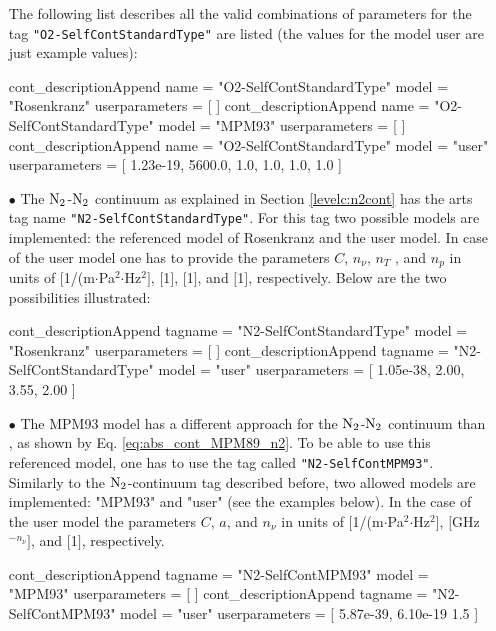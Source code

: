 \begin{itemize}
  The following list describes all the valid combinations of
  parameters for the tag {\tt "O2-SelfContStandardType"} are listed
  (the values for the model user are just example values):
\begin{code}
cont_descriptionAppend{
    name           = "O2-SelfContStandardType"
    model          = "Rosenkranz"
    userparameters = [ ]
}
cont_descriptionAppend{
    name           = "O2-SelfContStandardType"
    model          = "MPM93"
    userparameters = [ ]
}
cont_descriptionAppend{
    name           = "O2-SelfContStandardType"
    model          = "user"
    userparameters = [ 1.23e-19, 5600.0, 
                       1.0, 1.0, 1.0, 1.0 ]
}
\end{code}


\item[$\bullet$] The \citet{pwr:93} $\mbox{N}_2$-$\mbox{N}_2$ continuum as explained in Section 
\ref{levelc:n2cont} has the arts tag name {\tt "N2-SelfContStandardType"}. For this tag 
two possible models are implemented: the referenced model of Rosenkranz and the 
user model. In case of the user model one has to provide the parameters $C$, 
$n_{\nu}$, $n_T$ , and $n_p$ in units of
$[$1/(m$\cdot$Pa$^2$$\cdot$Hz$^2$$]$, $[$1$]$, $[$1$]$, and $[$1$]$,
respectively. Below are the two possibilities illustrated:
\begin{code}
cont_descriptionAppend{
    tagname        = "N2-SelfContStandardType"
    model          = "Rosenkranz"
    userparameters = [ ]
}
cont_descriptionAppend{
    tagname        = "N2-SelfContStandardType"
    model          = "user"
    userparameters = [ 1.05e-38, 2.00, 3.55, 2.00 ]
}
\end{code}

\item[$\bullet$] The MPM93 model \citep{liebeetal:93} has a different approach 
for the $\mbox{N}_2$-$\mbox{N}_2$ continuum than \citet{pwr:93}, as shown by 
Eq. \ref{eq:abs_cont_MPM89_n2}. To be able to use this referenced model, one 
has to use the tag called {\tt "N2-SelfContMPM93"}. Similarly to the 
$\mbox{N}_2$-continuum tag described before, two allowed models are implemented: 
"MPM93" and "user" (see the examples below).  In the case of the user model the 
parameters $C$, $a$, and $n_{\nu}$ in units of 
$[$1/(m$\cdot$Pa$^2$$\cdot$Hz$^2$$]$, $[$GHz$^{-n_{\nu}}$$]$, and $[$1$]$, 
respectively.
\begin{code}
cont_descriptionAppend{
    tagname        = "N2-SelfContMPM93"
    model          = "MPM93"
    userparameters = [ ]
}
cont_descriptionAppend{
    tagname        = "N2-SelfContMPM93"
    model          = "user"
    userparameters = [ 5.87e-39, 6.10e-19 1.5 ]
}
\end{code}



\end{itemize}
